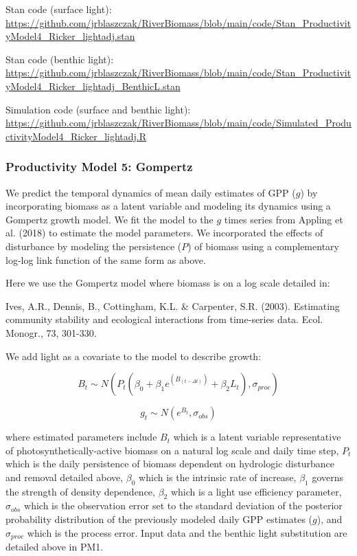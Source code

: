 \documentclass[]{article}
\begin{document}
Stan code (surface light):
\url{https://github.com/jrblaszczak/RiverBiomass/blob/main/code/Stan_ProductivityModel4_Ricker_lightadj.stan}

Stan code (benthic light):
\url{https://github.com/jrblaszczak/RiverBiomass/blob/main/code/Stan_ProductivityModel4_Ricker_lightadj_BenthicL.stan}

Simulation code (surface and benthic light):
\url{https://github.com/jrblaszczak/RiverBiomass/blob/main/code/Simulated_ProductivityModel4_Ricker_lightadj.R}

\subsubsection{Productivity Model 5:
Gompertz}\label{productivity-model-5-gompertz}

We predict the temporal dynamics of mean daily estimates of GPP (\(g\))
by incorporating biomass as a latent variable and modeling its dynamics
using a Gompertz growth model. We fit the model to the \(g\) times
series from Appling et al. (2018) to estimate the model parameters. We
incorporated the effects of disturbance by modeling the persistence
(\(P\)) of biomass using a complementary log-log link function of the
same form as above.

Here we use the Gompertz model where biomass is on a log scale detailed
in:

Ives, A.R., Dennis, B., Cottingham, K.L. \& Carpenter, S.R. (2003).
Estimating community stability and ecological interactions from
time-series data. Ecol. Monogr., 73, 301-330.

We add light as a covariate to the model to describe growth:

\begin{equation}
    B_{t} \sim N(P_{t}(\beta_{0} + \beta_{1}e^{(B_{(t-\Delta t)})} + \beta_{2}L_{t}), \sigma_{proc})
\end{equation}

\begin{equation}
    g_{t} \sim N(e^{B_{t}},\sigma_{obs})
\end{equation}

where estimated parameters include \(B_{t}\) which is a latent variable
representative of photosynthetically-active biomass on a natural log
scale and daily time step, \(P_{t}\) which is the daily persistence of
biomass dependent on hydrologic disturbance and removal detailed above,
\(\beta_0\) which is the intrinsic rate of increase, \(\beta_1\) governs
the strength of density dependence, \(\beta_2\) which is a light use
efficiency parameter, \(\sigma_{obs}\) which is the observation error
set to the standard deviation of the posterior probability distribution
of the previously modeled daily GPP estimates (\(g\)), and
\(\sigma_{proc}\) which is the process error. Input data and the benthic
light substitution are detailed above in PM1.
\end{document}
